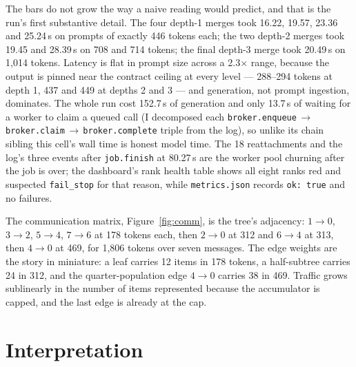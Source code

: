 \documentclass[11pt]{article}
\begin{document}
The bars do not grow the way a naive reading would predict, and that is the run's first
substantive detail. The four depth-1 merges took 16.22, 19.57, 23.36 and 25.24\,s on
prompts of exactly 446 tokens each; the two depth-2 merges took 19.45 and 28.39\,s on 708
and 714 tokens; the final depth-3 merge took 20.49\,s on 1{,}014 tokens. Latency is flat
in prompt size across a 2.3$\times$ range, because the output is pinned near the contract
ceiling at every level --- 288--294 tokens at depth 1, 437 and 449 at depths 2 and 3 ---
and generation, not prompt ingestion, dominates. The whole run cost 152.7\,s of
generation and only 13.7\,s of waiting for a worker to claim a queued call (I decomposed
each \texttt{broker.enqueue}\,$\to$\,\texttt{broker.claim}\,$\to$\,\texttt{broker.complete}
triple from the log), so unlike its chain sibling this cell's wall time is honest model
time. The 18 reattachments and the log's three events after \texttt{job.finish} at
80.27\,s are the worker pool churning after the job is over; the dashboard's rank health
table shows all eight ranks red and suspected \texttt{fail\_stop} for that reason, while
\texttt{metrics.json} records \texttt{ok: true} and no failures.

The communication matrix, Figure~\ref{fig:comm}, is the tree's adjacency: $1\!\to\!0$,
$3\!\to\!2$, $5\!\to\!4$, $7\!\to\!6$ at 178 tokens each, then $2\!\to\!0$ at 312 and
$6\!\to\!4$ at 313, then $4\!\to\!0$ at 469, for 1{,}806 tokens over seven messages. The
edge weights are the story in miniature: a leaf carries 12 items in 178 tokens, a
half-subtree carries 24 in 312, and the quarter-population edge $4\!\to\!0$ carries 38 in
469. Traffic grows sublinearly in the number of items represented because the accumulator
is capped, and the last edge is already at the cap.

\section{Interpretation}
\end{document}
